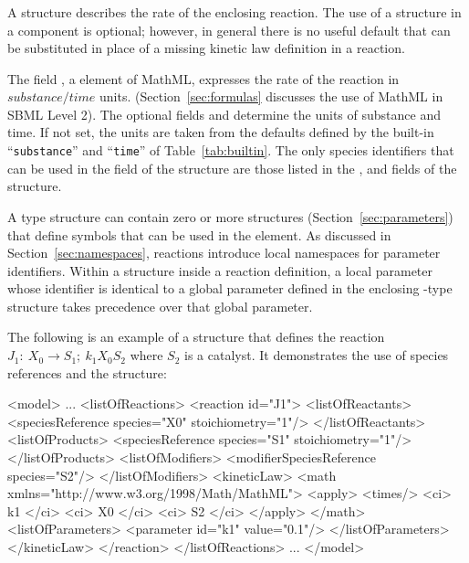 \documentclass[10pt,twocolumntoc]{cekarticle}
\newcommand{\vref}[1]{\ref{#1}}
\begin{document}
\subsubsection{}
\label{subsec:kinetic-law}

A  structure describes the rate of the enclosing
reaction.  The use of a  structure in a 
component is optional; however, in general there is no useful default that
can be substituted in place of a missing kinetic law definition in a
reaction.

The field , a  element of MathML,
expresses the rate of the reaction in $substance/time$ units.
(Section~\ref{sec:formulas} discusses the use of MathML in SBML
Level 2). The optional fields  and
 determine the units of substance and time. If
not set, the units are taken from the defaults defined by the
built-in ``\texttt{substance}'' and ``\texttt{time}'' of
Table~\vref{tab:builtin}.  The only species identifiers that can
be used in the  field of the 
structure are those listed in the ,
 and  fields of the
 structure.

A  type structure can contain zero or more
 structures (Section~\ref{sec:parameters}) that
define symbols that can be used in the  element. As
discussed in Section~\ref{sec:namespaces}, reactions introduce
local namespaces for parameter identifiers.  Within a
 structure inside a reaction definition, a local
parameter whose identifier is identical to a global parameter
defined in the enclosing -type structure takes
precedence over that global parameter.

The following is an example of a  structure that
defines the reaction $J_1: \ X_0 \longrightarrow S_1; \ k_1 X_0
S_2$ where $S_2$ is a catalyst. It demonstrates the use of species
references and the  structure:
\begin{example}
<model>
    ...
    <listOfReactions>
        <reaction id="J1">
            <listOfReactants>
                <speciesReference species="X0" stoichiometry="1"/>
            </listOfReactants>
            <listOfProducts>
                <speciesReference species="S1" stoichiometry="1"/>
            </listOfProducts>
            <listOfModifiers>
                <modifierSpeciesReference species="S2"/>
            </listOfModifiers>
            <kineticLaw>
                <math xmlns="http://www.w3.org/1998/Math/MathML">
                    <apply>
                        <times/>
                        <ci> k1 </ci>
                        <ci> X0 </ci>
                        <ci> S2 </ci>
                    </apply>
                </math>
                <listOfParameters>
                    <parameter id="k1" value="0.1"/>
                </listOfParameters>
            </kineticLaw>
        </reaction>
    </listOfReactions>
    ...
</model>
\end{example}
\end{document}
